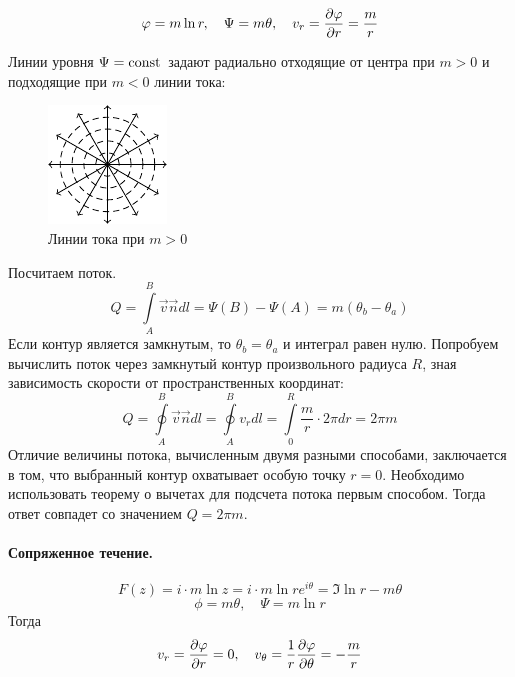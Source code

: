 \begin{equation}
	\varphi=m\ln{r}, \quad \Psi=m\theta, \quad v_r=\pdv{\varphi}{r}=\frac{m}{r}
\end{equation}

Линии уровня $\Psi=\mathrm{const}\,$ задают радиально отходящие от центра при $m>0$ и подходящие при $m<0$ линии тока:
\begin{figure}[h!]
    \centering
    \includegraphics[scale=1.5]{img/stok-vihr}
    \caption{Линии тока при $m>0$}
    \label{fig:figure1}
\end{figure}

Посчитаем поток. 
\begin{equation}
	Q=\int\limits_{A}^{B} \vec{v}\vec{n}dl=\Psi(B)-\Psi(A)=m(\theta_b-\theta_a)
\end{equation}
Если контур является замкнутым, то $\theta_b=\theta_a$ и интеграл равен нулю.
Попробуем вычислить поток через замкнутый контур произвольного радиуса $R$, зная зависимость скорости от пространственных координат: 
\begin{equation}
	Q=\oint\limits_{A}^{B} \vec{v}\vec{ n } dl=\oint\limits_{A}^{B} v_r dl=\int\limits_{0}^{R} \frac{m}{r} \cdot 2\pi dr =2\pi m%
\end{equation}
Отличие величины потока, вычисленным двумя разными способами, заключается в том, что выбранный контур охватывает особую точку $r=0$. Необходимо использовать теорему о вычетах для подсчета потока первым способом. Тогда ответ совпадет со значением $Q=2\pi m$.

\paragraph{Сопряженное течение.}
\begin{equation}
	F(z)=i\cdot m \ln{z}=i \cdot m \ln{re^{i \theta}}=\Im \ln{r}-m\theta
\end{equation}
\begin{equation}
	\phi=m\theta, \quad
	\Psi=m\ln{r}
\end{equation}
Тогда
\begin{equation}
	v_r=\pdv{\varphi}{r}=0, \quad
	v_\theta=\frac{1}{r}\pdv{\varphi}{\theta}=-\frac{m}{r}
\end{equation}

